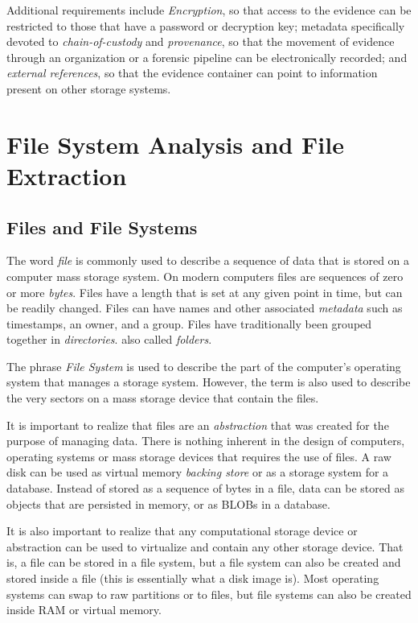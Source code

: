 \documentclass[11pt,letter]{article}
\begin{document}
Additional requirements include \emph{Encryption}, so that access to
the evidence can be restricted to those that have a password or
decryption key; metadata specifically devoted to
\emph{chain-of-custody} and \emph{provenance}, so that the movement of
evidence through an organization or a forensic pipeline can be
electronically recorded; and \emph{external references}, so that the
evidence container can point to information present on other storage
systems.

\section{File System Analysis and File Extraction}

\subsection{Files and File Systems}
The word \emph{file} is commonly used to describe a sequence of data
that is stored on a computer mass storage system. On modern computers
files are sequences of zero or more \emph{bytes}. Files have a length
that is set at any given point in time, but can be readily
changed. Files can have names and other associated \emph{metadata}
such as timestamps, an owner, and a group. Files have traditionally
been grouped together in
\emph{directories}. also
called \emph{folders}.

The phrase \emph{File
  System} is
used to describe the part of the computer's operating system that
manages a storage system. However, the term is also used to describe
the very sectors on a mass storage device that contain the files.

It is important to realize that files are an \emph{abstraction} that
was created for the purpose of managing data. There is nothing
inherent in the design of computers, operating systems or mass storage
devices that requires the use of files. A raw disk can be used as
virtual memory \emph{backing store} or as a storage system for a
database. Instead of stored as a sequence of bytes in a file, data can be stored as
objects that are persisted in memory, or as BLOBs in a database.

It is also important to realize that any computational storage device
or abstraction can be used to virtualize and contain any other storage
device. That is, a file can be stored in a file system, but a file
system can also be created and stored inside a file (this is
essentially what a disk image is). Most operating systems can swap to raw
partitions or to files, but file systems can also be created inside
RAM or virtual memory.
\end{document}
